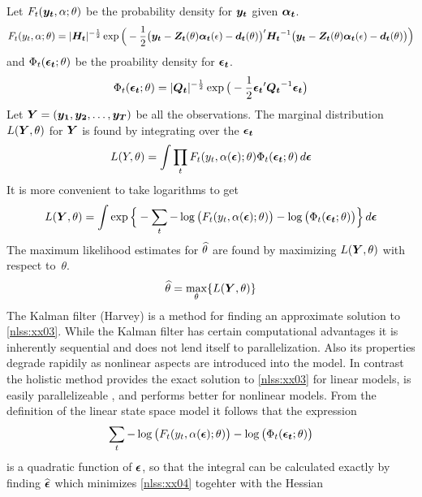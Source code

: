 Let $F_t(\boldsymbol{y_t},\alpha;\theta)$
be the probability density for $\boldsymbol{y_t}$ given $\boldsymbol{\alpha_t}$.
\begin{equation}
 F_t(y_t,\alpha;\theta)=|\boldsymbol{H_t}|^{-\frac{1}{2}}
  \exp\Big(-\frac{1}{2}
    \big(\boldsymbol{y_t}-\boldsymbol{Z_t}(\theta)\boldsymbol{\alpha_t}(\epsilon)-\boldsymbol{d_t}(\theta)\big)^\prime \boldsymbol{H_t}^{-1} 
  \big (\boldsymbol{y_t}-\boldsymbol{Z_t}(\theta)\boldsymbol{\alpha_t}(\epsilon)-\boldsymbol{d_t}(\theta)\big)\Big) 
\end{equation}
and $\Phi_t(\boldsymbol{\epsilon_t};\theta)$ be the proability density for $\boldsymbol{\epsilon_t}$.
\begin{equation}
 \Phi_t(\boldsymbol{\epsilon_t};\theta)=|\boldsymbol{Q_t}|^{-\frac{1}{2}}
  \exp\big(-\frac{1}{2} \boldsymbol{\epsilon_t}^\prime \boldsymbol{Q_t}^{-1} \boldsymbol{\epsilon_t} \big )
\end{equation}
Let $\boldsymbol{Y}=(\boldsymbol{y_1},\boldsymbol{y_2},\ldots,\boldsymbol{y_T})$ be all the observations.
The marginal distribution $L(\boldsymbol{Y},\theta)$ for $\boldsymbol{Y}$ is found by integrating over the
$\boldsymbol{\epsilon_t}$
\begin{equation}
L(Y,\theta)=\int \prod_t F_t(y_t,\alpha(\boldsymbol{\epsilon});\theta)
 \Phi_t(\boldsymbol{\epsilon_t};\theta)\,d\boldsymbol{\epsilon} 
\end{equation}
It is more convenient to take logarithms to
get
\begin{equation}
L(\boldsymbol{Y},\theta)=
  \int \exp\Big\{-\sum_t -\log\big(F_t(y_t,\alpha(\boldsymbol{\epsilon});\theta)\big)
 -\log\big(\Phi_t(\boldsymbol{\epsilon_t};\theta)\big)\Big\}\,d\boldsymbol{\epsilon} \label{nlss:xx02a}
\end{equation}
The maximum likelihood estimates for 
$\widehat\theta$ are found by maximizing 
$L(\boldsymbol{Y},\theta)$ with respect to~$\theta$.
\begin{equation}
\widehat\theta=\max_\theta \{ L(\boldsymbol{Y},\theta)\}\label{nlss:xx03}
\end{equation}
The Kalman filter (Harvey) is a method for finding an approximate solution
to \ref{nlss:xx03}. While the Kalman filter has certain computational 
advantages it is inherently sequential and does not lend itself to 
parallelization. Also its properties degrade rapidily as nonlinear aspects 
are introduced into the model. In contrast the holistic method
provides the exact solution to \ref{nlss:xx03} for linear
models, is easily parallelizeable ,
and performs better for nonlinear models.
From the definition of the linear state space model it follows that
the expression
\begin{equation}
  \sum_t -\log\big(F_t(y_t,\alpha(\boldsymbol{\epsilon});\theta)\big)
 -\log\big(\Phi_t(\boldsymbol{\epsilon_t};\theta)\big) \label{nlss:xx04}
\end{equation}
is a quadratic function of $\boldsymbol{\epsilon}$, so that the
integral can be calculated exactly by finding $\widehat{\boldsymbol{\epsilon}}$
which minimizes \ref{nlss:xx04} togehter with the Hessian 
